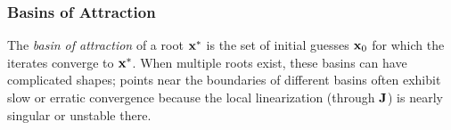 \subsubsection{Basins of Attraction}
\label{par:basins-of-attraction}
The \emph{basin of attraction} of a root \(\mathbf{x}^*\) is the set of initial guesses \(\mathbf{x}_0\) for which the iterates converge to \(\mathbf{x}^*\). When multiple roots exist, these basins can have complicated shapes; points near the boundaries of different basins often exhibit slow or erratic convergence because the local linearization (through \(\mathbf{J}\)) is nearly singular or unstable there.

